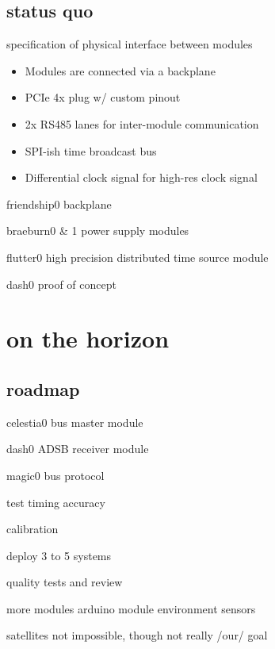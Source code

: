 \subsection{status quo}
  \begin{frame}{specification of physical interface between modules}
		\begin{itemize}
			\item Modules are connected via a backplane
			\item PCIe 4x plug w/ custom pinout
			\item 2x RS485 lanes for inter-module communication
			\item SPI-ish time broadcast bus
			\item Differential clock signal for high-res clock signal
		\end{itemize}
	\end{frame}
	\begin{frame}{friendship0 backplane}
	\end{frame}
	\begin{frame}{braeburn0 \& 1 power supply modules}
	\end{frame}
	\begin{frame}{flutter0 high precision distributed time source module}
	\end{frame}
	\begin{frame}{dash0 proof of concept}
	\end{frame}

\section{on the horizon}	

\subsection{roadmap}
	\begin{frame}{celestia0 bus master module}
	\end{frame}
	\begin{frame}{dash0 ADSB receiver module}
	\end{frame}
	\begin{frame}{magic0 bus protocol}
	\end{frame}
	\begin{frame}{test timing accuracy}
	\end{frame}
	\begin{frame}{calibration}
	\end{frame}
	\begin{frame}{deploy 3 to 5 systems}
	\end{frame}
	\begin{frame}{quality tests and review}
	\end{frame}
	\begin{frame}{more modules}
		arduino module
		environment sensors
	\end{frame}
	\begin{frame}{satellites}
		not impossible, though not really /our/ goal
	\end{frame}

